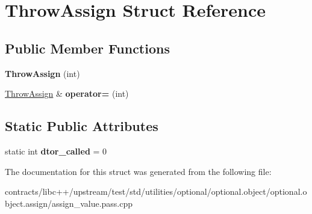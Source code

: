 \hypertarget{struct_throw_assign}{}\section{Throw\+Assign Struct Reference}
\label{struct_throw_assign}
\subsection*{Public Member Functions}
\begin{DoxyCompactItemize}
\item 
\mbox{\label{struct_throw_assign_a03d4e531bdd7f78d87a74c5183d51e26}} 
{\bfseries Throw\+Assign} (int)
\item 
\mbox{\label{struct_throw_assign_a79ccf8041955423cebf421ac28b15885}} 
\mbox{\hyperlink{struct_throw_assign}{Throw\+Assign}} \& {\bfseries operator=} (int)
\end{DoxyCompactItemize}
\subsection*{Static Public Attributes}
\begin{DoxyCompactItemize}
\item 
\mbox{\label{struct_throw_assign_a1ab897412a2d349183a5b5b59c7515ee}} 
static int {\bfseries dtor\+\_\+called} = 0
\end{DoxyCompactItemize}


The documentation for this struct was generated from the following file\+:\begin{DoxyCompactItemize}
\item 
contracts/libc++/upstream/test/std/utilities/optional/optional.\+object/optional.\+object.\+assign/assign\+\_\+value.\+pass.\+cpp\end{DoxyCompactItemize}
